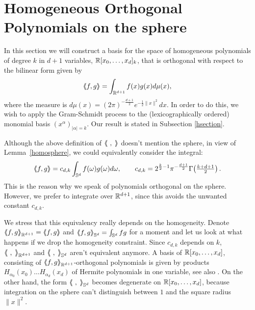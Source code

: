\section{Homogeneous Orthogonal Polynomials on the sphere} \label{polynomialSection}
In this section we will construct a basis for the space of homogeneous polynomials of degree $k$ in $d+1$ variables, $\mathbb{R}[x_0,\ldots,x_d]_k$, that is orthogonal with respect to the bilinear form given by
\begin{equation} \label{spherebracket}
 \left<\!\!\!\:\left< f,g\right>\!\!\!\:\right> = \int_{\mathbb{R}^{d+1}}f(x)g(x) d\mu(x),
\end{equation}
where the measure is $d\mu(x) = (2\pi)^{-\frac{d+1}{2}}e^{-\frac{1}{2}\|x\|^2}dx$. In order to do this, we wish to apply the Gram-Schmidt process to the (lexicographically ordered) monomial basis $(x^\alpha)_{|\alpha |=k}$. Our result is stated in Subsection \ref{hsection}. 
\begin{remark}
Although the above definition of $\bra\ ,\;\ket$ doesn't mention the sphere, in view of Lemma~\ref{homosphere}, we could equivalently consider the integral:
$$
 \left<\!\!\!\:\left< f,g\right>\!\!\!\:\right> = c_{d,k} \int_{\mathbb{S}^{d}}f(\omega)g(\omega) d\omega, \qquad c_{d,k} = 2^{\frac{k}{2}-1}\pi^{-\frac{d+1}{2}}\Gamma\!\left(\tfrac{k+d+1}{2}\right).
$$ 
This is the reason why we speak of polynomials orthogonal on the sphere. However, we prefer to integrate over $\mathbb{R}^{d+1}$, since this avoids the unwanted constant $c_{d,k}$.
\end{remark}

\begin{remark}\label{hermite}
We stress that this equivalency really depends on the homogeneity. Denote $\bra f ,g\ket_{\R^{d+1}} = \bra f,g\ket$ and $\left<\!\!\!\:\left< f ,g\right>\!\!\!\:\right>_{\mathbb{S}^{d}}=\int_{\mathbb{S}^{d}} f g$ for a moment and let us look at what happens if we drop the homogeneity constraint. Since $c_{d,k}$ depends on $k$, $\left<\!\!\!\:\left<\ ,\;\right>\!\!\!\:\right>_{\mathbb{R}^{d+1}}$ and $\left<\!\!\!\:\left<\ ,\;\right>\!\!\!\:\right>_{\mathbb{S}^d}$ aren't equivalent anymore. A basis of $\mathbb{R}[x_0,\ldots,x_d]$, consisting of $\left<\!\!\!\:\left< f ,g\right>\!\!\!\:\right>_{\mathbb{R}^{d+1}}$-orthogonal polynomials is given by products $H_{\alpha_0}\!(x_0)\ldots H_{\alpha_d}\!(x_d)$ of Hermite polynomials in one variable, see also \cite[Sect.~2.3.4]{Dunkl}. On the other hand, the form $\left<\!\!\!\:\left<\ ,\;\right>\!\!\!\:\right>_{\mathbb{S}^d}$ becomes degenerate on $\mathbb{R}[x_0,\ldots,x_d]$, because integration on the sphere can't distinguish between $1$ and the square radius $\|x\|^2$. 
\end{remark}

